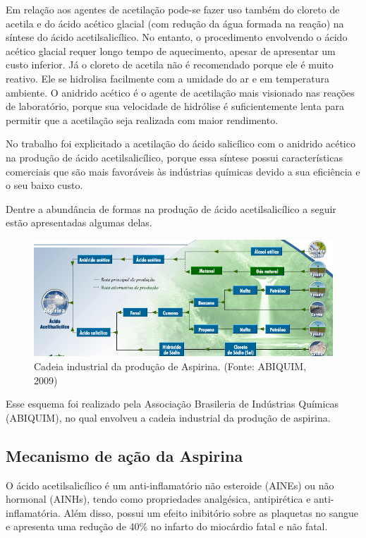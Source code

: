 Em relação aos agentes de acetilação pode-se fazer uso também do cloreto de acetila e do ácido
acético glacial (com redução da água formada na reação) na síntese do ácido acetilsalicílico.  No
entanto, o procedimento envolvendo o ácido acético glacial requer longo tempo de aquecimento, apesar
de apresentar um custo inferior. Já o cloreto de acetila não é recomendado porque ele é muito
reativo. Ele se hidrolisa facilmente com a umidade do ar e em temperatura ambiente. O anidrido
acético é o agente de acetilação mais visionado nas reações de laboratório, porque sua velocidade de
hidrólise é suficientemente lenta para permitir que a acetilação seja realizada com maior
rendimento.~\cite{PERUCH2013}

No trabalho foi explicitado a acetilação do ácido salicílico com o anidrido acético na produção de
ácido acetilsalicílico, porque essa síntese possui características comerciais que são mais
favoráveis às indústrias químicas devido a sua eficiência e o seu baixo custo. 

Dentre a abundância de formas na produção de ácido acetilsalicílico a seguir estão apresentadas
algumas delas.

\begin{figure}[H]
\begin{center}
    \includegraphics[scale=0.83]{figuras/abiquim.png}
\end{center}
\caption{Cadeia industrial da produção de Aspirina\R. (Fonte: ABIQUIM, 2009)}
\label{fig:abiquim}
\end{figure}

Esse esquema foi realizado pela  Associação Brasileria de Indústrias Químicas (ABIQUIM), no qual
envolveu a cadeia industrial da produção de aspirina.~\cite{abiquim}

\subsection{Mecanismo de ação da Aspirina}

O ácido acetilsalicílico é um anti-inflamatório não esteroide (AINEs) ou não hormonal (AINHs), tendo
como propriedades analgésica, antipirética e anti-inflamatória. Além disso, possui um efeito
inibitório sobre as plaquetas no sangue e apresenta uma redução de 40\% no infarto do miocárdio
fatal e não fatal.~\cite{Palomo2008}

